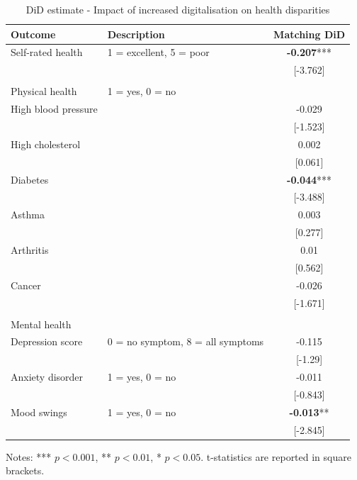 \begin{table}[h!]
    \centering
    \caption{DiD estimate - Impact of increased digitalisation on health disparities}
    \label{tab:did}
    \begin{threeparttable}
        \begin{tabular}{llc}
            \toprule
            Outcome & Description & Matching DiD \\
            \midrule
            Self-rated health & 1 = excellent, 5 = poor & \textbf{-0.207}*** \\
            &  & [-3.762] \\
            & & \\
            Physical health & 1 = yes, 0 = no & \\
            High blood pressure &  & -0.029 \\
            &  & [-1.523] \\
            High cholesterol &  & 0.002 \\
            &  & [0.061] \\
            Diabetes &  & \textbf{-0.044}*** \\
            &  & [-3.488] \\
            Asthma &  & 0.003 \\
            &  & [0.277] \\
            Arthritis &  & 0.01 \\
            &  & [0.562] \\
            Cancer &  & -0.026 \\
            &  & [-1.671] \\
            & & \\
            Mental health & & \\
            Depression score & 0 = no symptom, 8 = all symptoms & -0.115 \\
            &  & [-1.29] \\
            Anxiety disorder & 1 = yes, 0 = no & -0.011 \\
            &  & [-0.843] \\
            Mood swings & 1 = yes, 0 = no & \textbf{-0.013}** \\
            &  & [-2.845] \\
            \bottomrule
        \end{tabular}
        \begin{tablenotes}
            \footnotesize
            \item Notes: *** $p < 0.001$, ** $p < 0.01$, * $p < 0.05$. t-statistics are reported in square brackets.
        \end{tablenotes}
    \end{threeparttable}
\end{table}